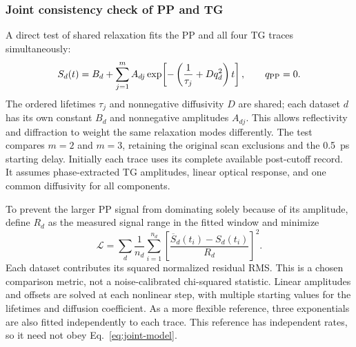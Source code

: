 \subsubsection{Joint consistency check of PP and TG}\label{sec:joint-consistency}
A direct test of shared relaxation fits the PP and all four TG traces simultaneously:
\begin{equation}\label{eq:joint-model}
S_d(t)=B_d+\sum_{j=1}^{m}A_{dj}
\exp\!\left[-\left(\frac{1}{\tau_j}+Dq_d^2\right)t\right],
\qquad q_{\rm PP}=0 .
\end{equation}
The ordered lifetimes $\tau_j$ and nonnegative diffusivity $D$ are shared; each dataset $d$ has its own constant $B_d$ and nonnegative amplitudes $A_{dj}$. This allows reflectivity and diffraction to weight the same relaxation modes differently. The test compares $m=2$ and $m=3$, retaining the original scan exclusions and the \SI{0.5}{ps} starting delay. Initially each trace uses its complete available post-cutoff record. It assumes phase-extracted TG amplitudes, linear optical response, and one common diffusivity for all components.

To prevent the larger PP signal from dominating solely because of its amplitude, define $R_d$ as the measured signal range in the fitted window and minimize
\begin{equation}
\mathcal L=\sum_d\frac{1}{n_d}\sum_{i=1}^{n_d}
\left[\frac{\overline S_d(t_i)-S_d(t_i)}{R_d}\right]^2 .
\end{equation}
Each dataset contributes its squared normalized residual RMS. This is a chosen comparison metric, not a noise-calibrated chi-squared statistic. Linear amplitudes and offsets are solved at each nonlinear step, with multiple starting values for the lifetimes and diffusion coefficient. As a more flexible reference, three exponentials are also fitted independently to each trace. This reference has independent rates, so it need not obey Eq.~\eqref{eq:joint-model}.

